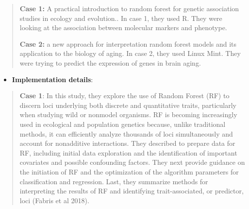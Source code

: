 \begin{quote}
\textbf{Case 1:} A practical introduction to random forest for genetic
association studies in ecology and evolution.. In case 1, they used R.
They were looking at the association between molecular markers and
phenotype.

\textbf{Case 2:} a new approach for interpretation random forest models
and its application to the biology of aging. In case 2, they used Linux
Mint. They were trying to predict the expression of genes in brain
aging.
\end{quote}

\begin{itemize}
\item
  \textbf{Implementation details}:
\end{itemize}

\begin{quote}
\textbf{Case 1}: In this study, they explore the use of Random Forest
(RF) to discern loci underlying both discrete and quantitative traits,
particularly when studying wild or nonmodel organisms. RF is becoming
increasingly used in ecological and population genetics because, unlike
traditional methods, it can efficiently analyze thousands of loci
simultaneously and account for nonadditive interactions. They described
to prepare data for RF, including initial data exploration and the
identification of important covariates and possible confounding factors.
They next provide guidance on the initiation of RF and the optimization
of the algorithm parameters for classification and regression. Last,
they summarize methods for interpreting the results of RF and
identifying trait-associated, or predictor, loci (Fabris et al 2018).


\end{quote}

